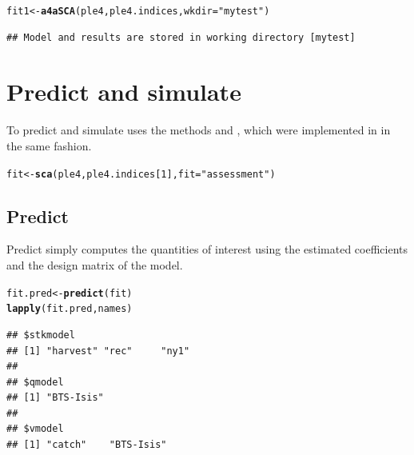 \documentclass[a4paper,english,10pt]{article}\usepackage[]{graphicx}\usepackage[]{color}
\makeatletter
\newcommand{\hlnum}[1]{\textcolor[rgb]{0.686,0.059,0.569}{#1}}%
\newcommand{\hlstr}[1]{\textcolor[rgb]{0.192,0.494,0.8}{#1}}%
\newcommand{\hlstd}[1]{\textcolor[rgb]{0.345,0.345,0.345}{#1}}%
\newcommand{\hlkwb}[1]{\textcolor[rgb]{0.69,0.353,0.396}{#1}}%
\newcommand{\hlkwc}[1]{\textcolor[rgb]{0.333,0.667,0.333}{#1}}%
\newcommand{\hlkwd}[1]{\textcolor[rgb]{0.737,0.353,0.396}{\textbf{#1}}}%
\newenvironment{kframe}{%
 \def\at@end@of@kframe{}%
 \ifinner\ifhmode%
  \def\at@end@of@kframe{\end{minipage}}%
  \begin{minipage}{\columnwidth}%
 \fi\fi%
 \def\FrameCommand##1{\hskip\@totalleftmargin \hskip-\fboxsep
 \colorbox{shadecolor}{##1}\hskip-\fboxsep
     \hskip-\linewidth \hskip-\@totalleftmargin \hskip\columnwidth}%
 \MakeFramed {\advance\hsize-\width
   \@totalleftmargin\z@ \linewidth\hsize
   \@setminipage}}%
 {\par\unskip\endMakeFramed%
 \at@end@of@kframe}
\newenvironment{knitrout}{}{} %
\makeatother
\begin{document}
\begin{knitrout}
\color{fgcolor}\begin{kframe}
\begin{alltt}
\hlstd{fit1} \hlkwb{<-} \hlkwd{a4aSCA}\hlstd{(ple4, ple4.indices,} \hlkwc{wkdir} \hlstd{=} \hlstr{"mytest"}\hlstd{)}
\end{alltt}
\begin{verbatim}
## Model and results are stored in working directory [mytest]
\end{verbatim}
\end{kframe}
\end{knitrout}

\section{Predict and simulate}

To predict and simulate  uses the methods  and , which were implemented in  in the same fashion.

\begin{knitrout}
\color{fgcolor}\begin{kframe}
\begin{alltt}
\hlstd{fit} \hlkwb{<-} \hlkwd{sca}\hlstd{(ple4, ple4.indices[}\hlnum{1}\hlstd{],} \hlkwc{fit} \hlstd{=} \hlstr{"assessment"}\hlstd{)}
\end{alltt}
\end{kframe}
\end{knitrout}

\subsection{Predict}

Predict simply computes the quantities of interest using the estimated coefficients and the design matrix of the model.

\begin{knitrout}
\color{fgcolor}\begin{kframe}
\begin{alltt}
\hlstd{fit.pred} \hlkwb{<-} \hlkwd{predict}\hlstd{(fit)}
\hlkwd{lapply}\hlstd{(fit.pred, names)}
\end{alltt}
\begin{verbatim}
## $stkmodel
## [1] "harvest" "rec"     "ny1"    
## 
## $qmodel
## [1] "BTS-Isis"
## 
## $vmodel
## [1] "catch"    "BTS-Isis"
\end{verbatim}
\end{kframe}
\end{knitrout}
\end{document}
